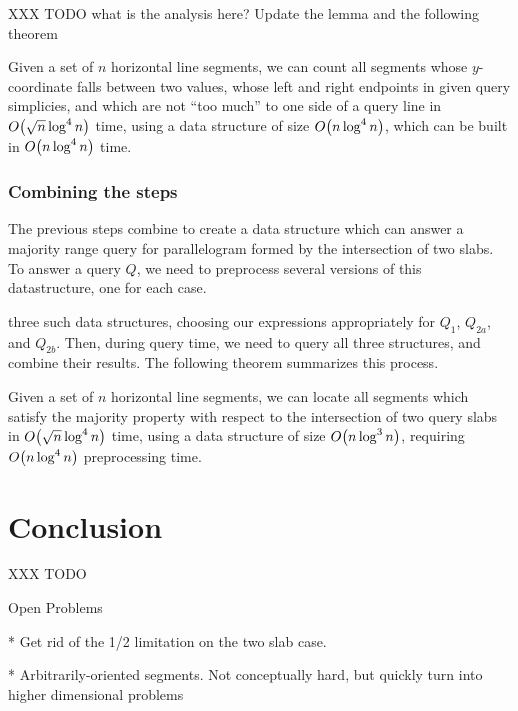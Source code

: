 XXX TODO what is the analysis here?  Update the lemma and the following theorem

\begin{lemma}
\label{lem:slabs:two:step4}
Given a set of $n$ horizontal line segments, we can count all segments whose $y$-coordinate falls between two values, whose left and right endpoints in given query simplicies, and which are not ``too much'' to one side of a query line in $O\!\left(\sqrt{n}\log^4{n}\right)$ time, using a data structure of size $O\!\left(n\log^4{n}\right)$, which can be built in $O\!\left(n\log^4{n}\right)$ time.
\end{lemma}


\subsubsection{Combining the steps}

The previous steps combine to create a data structure which can answer a majority range query for parallelogram formed by the intersection of two slabs. To answer a query $Q$, we need to preprocess several versions of this datastructure, one for each case.

 three such data structures, choosing our expressions appropriately for $Q_1$, $Q_{2a}$, and $Q_{2b}$.  Then, during query time, we need to query all three structures, and combine their results. The following theorem summarizes this process.

\begin{theorem}
\label{thm:slabs:two}
Given a set of $n$ horizontal line segments, we can locate all segments which satisfy the majority property with respect to the intersection of two query slabs in $O\!\left(\sqrt{n}\log^4{n}\right)$ time, using a data structure of size $O\!\left(n\log^3{n}\right)$, requiring $O\!\left(n\log^4{n}\right)$ preprocessing time.
\end{theorem}



\section{Conclusion}
\label{:slabs:concl}

XXX TODO

Open Problems

* Get rid of the 1/2 limitation on the two slab case.

* Arbitrarily-oriented segments. Not conceptually hard, but quickly turn into higher dimensional problems

